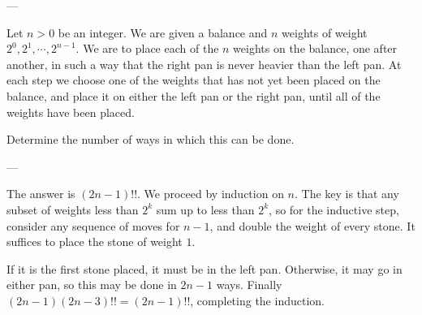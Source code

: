 
---

Let $n>0$ be an integer. We are given a balance and $n$ weights of weight $2^0,2^1,\cdots,2^{n-1}$. We are to place each of the $n$ weights on the balance, one after another, in such a way that the right pan is never heavier than the left pan. At each step we choose one of the weights that has not yet been placed on the balance, and place it on either the left pan or the right pan, until all of the weights have been placed.

Determine the number of ways in which this can be done.

---

The answer is $(2n-1)!!$. We proceed by induction on $n$. The key is that any subset of weights less than $2^k$ sum up to less than $2^k$, so for the inductive step, consider any sequence of moves for $n-1$, and double the weight of every stone. It suffices to place the stone of weight $1$.

If it is the first stone placed, it must be in the left pan. Otherwise, it may go in either pan, so this may be done in $2n-1$ ways. Finally $(2n-1)(2n-3)!!=(2n-1)!!$, completing the induction.

